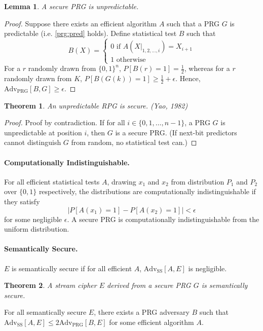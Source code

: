 \documentclass{article}
\newtheorem{theorem}{Theorem}
\newtheorem{lemma}{Lemma}
\begin{document}
\begin{lemma}
  A secure PRG is unpredictable.
\end{lemma}

\begin{proof}
  Suppose there exists an efficient algorithm $A$ such that a PRG $G$ is
  predictable (i.e. \eqref{prg:pred} holds). Define statistical test $B$ such
  that \begin{equation}
    B(X) = \begin{cases}
      0 \text{ if } A(X|_{1,2,\ldots,i}) = X_{i+1} \\
      1 \text{ otherwise}
    \end{cases}
  \end{equation}
  For a $r$ randomly drawn from $\{0, 1\}^n$, $P[B(r) = 1] = \frac{1}{2}$,
  whereas for a $r$ randomly drawn from $K$, $P[B(G(k)) = 1] \geq \frac{1}{2} +
  \epsilon$. Hence, $\text{Adv}_\text{PRG}[B, G] \geq \epsilon$.
\end{proof}

\begin{theorem}
  An unpredictable RPG is secure. (Yao, 1982)
\end{theorem}

\begin{proof}
  Proof by contradiction. If for all $i \in \{0,1,\ldots,n-1\}$, a PRG $G$ is
  unpredictable at position $i$, then $G$ is a secure PRG. (If next-bit
  predictors cannot distinguish $G$ from random, no statistical test can.)
\end{proof}

\paragraph{Computationally Indistinguishable.} For all efficient statistical
tests $A$, drawing $x_1$ and $x_2$ from distribution $P_1$ and $P_2$ over $\{0,
1\}$ respectively, the distributions are computationally indistinguishable if
they satisfy \begin{equation}
  |P[A(x_1) = 1] - P[A(x_2) = 1]| < \epsilon
\end{equation} for some negligible $\epsilon$. A secure PRG is computationally
indistinguishable from the uniform distribution.

\paragraph{Semantically Secure.} $E$ is semantically secure if for all
efficient $A$, $\text{Adv}_\text{SS}[A,E]$ is negligible.

\begin{theorem}
  A stream cipher $E$ derived from a secure PRG $G$ is semantically secure.
\end{theorem}

For all semantically secure $E$, there exists a PRG adversary $B$ such that
$\text{Adv}_\text{SS}[A, E] \leq 2\text{Adv}_\text{PRG}[B, E]$ for some
efficient algorithm $A$.
\end{document}
